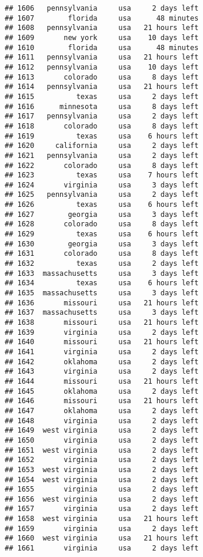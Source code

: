 \documentclass[
]{article}
\begin{document}
\begin{verbatim}
## 1606   pennsylvania     usa     2 days left
## 1607        florida     usa      48 minutes
## 1608   pennsylvania     usa   21 hours left
## 1609       new york     usa    10 days left
## 1610        florida     usa      48 minutes
## 1611   pennsylvania     usa   21 hours left
## 1612   pennsylvania     usa    10 days left
## 1613       colorado     usa     8 days left
## 1614   pennsylvania     usa   21 hours left
## 1615          texas     usa     2 days left
## 1616      minnesota     usa     8 days left
## 1617   pennsylvania     usa     2 days left
## 1618       colorado     usa     8 days left
## 1619          texas     usa    6 hours left
## 1620     california     usa     2 days left
## 1621   pennsylvania     usa     2 days left
## 1622       colorado     usa     8 days left
## 1623          texas     usa    7 hours left
## 1624       virginia     usa     3 days left
## 1625   pennsylvania     usa     2 days left
## 1626          texas     usa    6 hours left
## 1627        georgia     usa     3 days left
## 1628       colorado     usa     8 days left
## 1629          texas     usa    6 hours left
## 1630        georgia     usa     3 days left
## 1631       colorado     usa     8 days left
## 1632          texas     usa     2 days left
## 1633  massachusetts     usa     3 days left
## 1634          texas     usa    6 hours left
## 1635  massachusetts     usa     3 days left
## 1636       missouri     usa   21 hours left
## 1637  massachusetts     usa     3 days left
## 1638       missouri     usa   21 hours left
## 1639       virginia     usa     2 days left
## 1640       missouri     usa   21 hours left
## 1641       virginia     usa     2 days left
## 1642       oklahoma     usa     2 days left
## 1643       virginia     usa     2 days left
## 1644       missouri     usa   21 hours left
## 1645       oklahoma     usa     2 days left
## 1646       missouri     usa   21 hours left
## 1647       oklahoma     usa     2 days left
## 1648       virginia     usa     2 days left
## 1649  west virginia     usa     2 days left
## 1650       virginia     usa     2 days left
## 1651  west virginia     usa     2 days left
## 1652       virginia     usa     2 days left
## 1653  west virginia     usa     2 days left
## 1654  west virginia     usa     2 days left
## 1655       virginia     usa     2 days left
## 1656  west virginia     usa     2 days left
## 1657       virginia     usa     2 days left
## 1658  west virginia     usa   21 hours left
## 1659       virginia     usa     2 days left
## 1660  west virginia     usa   21 hours left
## 1661       virginia     usa     2 days left

\end{verbatim}
\end{document}
